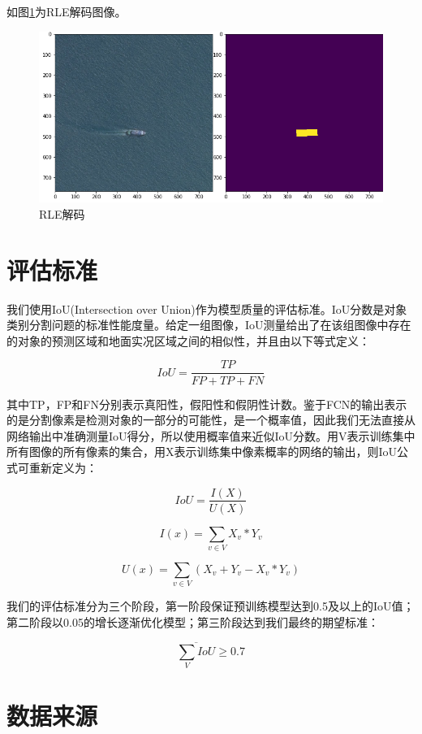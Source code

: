 如图\ref{fig::EDA2}为RLE解码图像。

\begin{figure}[htbp]
\centering
\includegraphics[width=1\linewidth]{body/EDA_pic/RLE}
\caption{RLE解码}
\label{fig::EDA2}
\end{figure}

\section{评估标准}\label{ux8bc4ux4f30ux6807ux51c6}

我们使用IoU(Intersection over
Union)作为模型质量的评估标准。IoU分数是对象类别分割问题的标准性能度量。给定一组图像，IoU测量给出了在该组图像中存在的对象的预测区域和地面实况区域之间的相似性，并且由以下等式定义：

\[IoU = \frac{TP}{FP+TP+FN}\]

其中TP，FP和FN分别表示真阳性，假阳性和假阴性计数。鉴于FCN的输出表示的是分割像素是检测对象的一部分的可能性，是一个概率值，因此我们无法直接从网络输出中准确测量IoU得分，所以使用概率值来近似IoU分数。用V表示训练集中所有图像的所有像素的集合，用X表示训练集中像素概率的网络的输出，则IoU公式可重新定义为：

\[IoU = \frac{I(X)}{U(X)}\]

\[I(x) = \sum_{v\in V}X_v * Y_v\]

\[U(x) = \sum_{v\in V}(X_v + Y_v - X_v * Y_v)\]

我们的评估标准分为三个阶段，第一阶段保证预训练模型达到0.5及以上的IoU值；第二阶段以0.05的增长逐渐优化模型；第三阶段达到我们最终的期望标准：

\[\overline{\sum_V IoU}\geq0.7\]

\section{数据来源}\label{ux6570ux636eux6765ux6e90}

